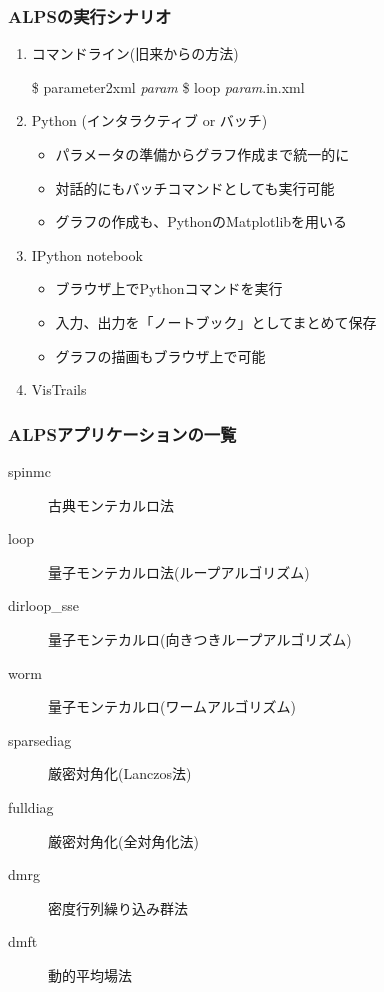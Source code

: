 \begin{frame}[fragile]
  \frametitle{ALPSの実行シナリオ}
  \begin{enumerate}
  \item コマンドライン(旧来からの方法)
\begin{semiverbatim}
\$ parameter2xml \textit{param}
\$ loop \textit{param}.in.xml
\end{semiverbatim}
  \item {\color{red}Python} (インタラクティブ or バッチ)
    \begin{itemize}
    \item パラメータの準備からグラフ作成まで統一的に
    \item 対話的にもバッチコマンドとしても実行可能
    \item グラフの作成も、PythonのMatplotlibを用いる
    \end{itemize}
  \item {\color{red}IPython notebook}
    \begin{itemize}
    \item ブラウザ上でPythonコマンドを実行
    \item 入力、出力を「ノートブック」としてまとめて保存
    \item グラフの描画もブラウザ上で可能
    \end{itemize}
  \item VisTrails
  \end{enumerate}
\end{frame}

\begin{frame}
  \frametitle{ALPSアプリケーションの一覧}
  \begin{description}
  \item[spinmc] 古典モンテカルロ法
  \item[loop] 量子モンテカルロ法(ループアルゴリズム)
  \item[dirloop\_sse] 量子モンテカルロ(向きつきループアルゴリズム)
  \item[worm] 量子モンテカルロ(ワームアルゴリズム)
  \item[sparsediag] 厳密対角化(Lanczos法)
  \item[fulldiag] 厳密対角化(全対角化法)
  \item[dmrg] 密度行列繰り込み群法
  \item[dmft] 動的平均場法
  \end{description}
\end{frame}

